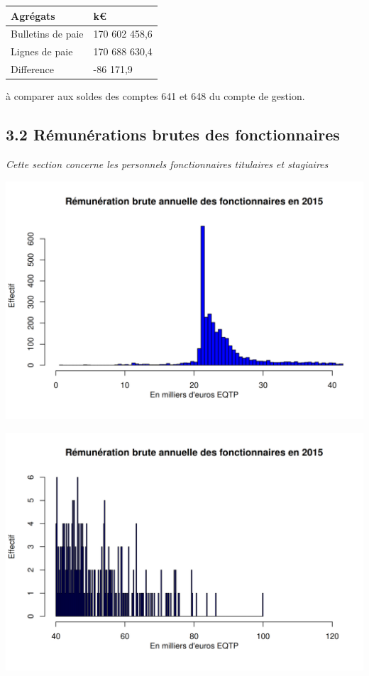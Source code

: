 \begin{longtable}[]{@{}ll@{}}
\toprule
Agrégats & k€\tabularnewline
\midrule
\endhead
Bulletins de paie & 170 602 458,6\tabularnewline
Lignes de paie & 170 688 630,4\tabularnewline
Difference & -86 171,9\tabularnewline
\bottomrule
\end{longtable}

à comparer aux soldes des comptes 641 et 648 du compte de gestion.

\hypertarget{remunerations-brutes-des-fonctionnaires-1}{%
\subsection{3.2 Rémunérations brutes des
fonctionnaires}\label{remunerations-brutes-des-fonctionnaires-1}}

\emph{Cette section concerne les personnels fonctionnaires titulaires et
stagiaires}

\includegraphics{altair_files/figure-latex/unnamed-chunk-76-1.png}

\includegraphics{altair_files/figure-latex/unnamed-chunk-76-2.png}

